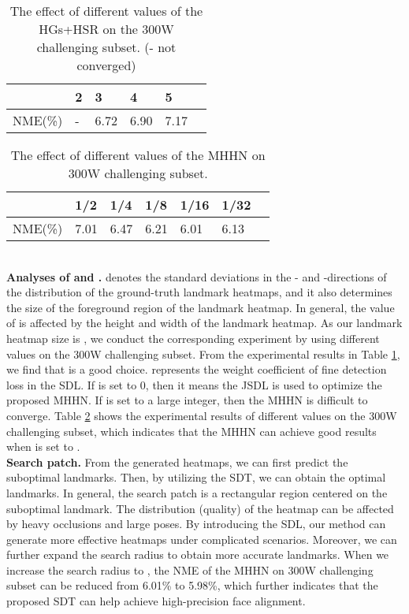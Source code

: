 \documentclass[journal]{IEEEtran}
\begin{document}
\begin{table}
	\caption{The effect of different  values of the HGs+HSR on the 300W challenging subset.  (- not converged)}
	\begin{center}
		\begin{tabular}{p{1.0cm}p{1.0cm}p{1.0cm}p{1.0cm}p{1.0cm}p{1.0cm}}
			\hline
			 & 2 & 3 &4 &5  \\
			\hline
			NME(\%) &- & 6.72 & 6.90 &7.17 \\
			\hline
		\end{tabular}
	\end{center}
	\label{tabsigmma}
\end{table}
\begin{table}
	\caption{The effect of different  values of the MHHN on 300W challenging subset.}
	\begin{center}
		\begin{tabular}{p{1.0cm}p{1.0cm}p{1.0cm}p{1.0cm}p{1.0cm}p{1.0cm}p{1.0cm}}
			\hline
			 & 1/2 & 1/4 & 1/8 &1/16 &1/32  \\
			\hline
			NME(\%) &7.01 & 6.47 & 6.21 &6.01 &6.13 \\
			\hline
		\end{tabular}
	\end{center}
	\label{tablambda}
\end{table}
\\\indent\textbf{Analyses of  and .}  denotes the standard deviations in the - and -directions of the distribution of the ground-truth landmark heatmaps, and it also determines the size of the foreground region of the landmark heatmap. In general, the value of  is affected by the height and width of the landmark heatmap. As our landmark heatmap size is , we conduct the corresponding experiment by using different  values on the 300W challenging subset. From the experimental results in Table \ref{tabsigmma}, we find that  is a good choice.  represents the weight coefficient of fine detection loss in the SDL. If  is set to 0, then it means the JSDL is used to optimize the proposed MHHN. If  is set to a large integer, then the MHHN is difficult to converge. Table \ref{tablambda} shows the experimental results of different  values on the 300W challenging subset, which indicates that the MHHN can achieve good results when   is set to . 
\\\indent\textbf{Search patch.} From the generated heatmaps, we can first predict the suboptimal landmarks. Then, by utilizing the SDT, we can obtain the optimal landmarks. In general, the search patch is a  rectangular region centered on the suboptimal landmark. The distribution (quality) of the heatmap can be affected by heavy occlusions and large poses. By introducing the SDL, our method can generate more effective heatmaps under complicated scenarios. Moreover, we can further expand the search radius to obtain more accurate landmarks. When we increase the search radius to , the NME of the MHHN on 300W challenging subset can be reduced from 6.01\% to 5.98\%, which further indicates that the proposed SDT can help achieve high-precision face alignment.
\end{document}
